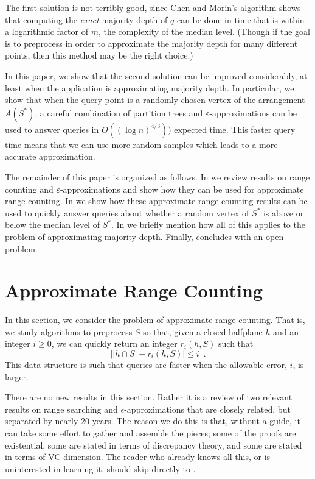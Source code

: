\documentclass{patmorin}
\newcommand{\eps}{\varepsilon}
\begin{document}
The first solution is not terribly good, since Chen and Morin's algorithm
shows that computing the \emph{exact} majority depth of $q$ can be done
in time that is within a logarithmic factor of $m$, the complexity of
the median level.  (Though if the goal is to preprocess in order to
approximate the majority depth for many different points, then this
method may be the right choice.)

In this paper, we show that the second solution can be improved
considerably, at least when the application is approximating majority
depth.  In particular, we show that when the query point is a randomly
chosen vertex of the arrangement $A(S^*)$, a careful combination of
partition trees \cite{c12} and $\eps$-approximations \cite{mww93}
can be used to answer queries in $O((\log n)^{4/3}))$ expected time.
This faster query time means that we can use more random samples which
leads to a more accurate approximation.

The remainder of this paper is organized as follows.  In
 we review results on range counting and
$\eps$-approximations and show how they can be used for approximate range
counting.  In  we show how these approximate range
counting results can be used to quickly answer queries about whether
a random vertex of $S^*$ is above or below the median level of $S^*$.
In  we briefly mention how all of this applies to
the problem of approximating majority depth.  Finally, 
concludes with an open problem.

\section{Approximate Range Counting}

In this section, we consider the problem of approximate range counting.
That is, we study algorithms to preprocess $S$ so that, given a closed
halfplane $h$ and an integer $i\ge 0$, we can quickly return an integer
$r_i(h,S)$ such that
\[
   \left| |h\cap S| - r_i(h,S)\right| \le i \enspace .
\]
This data structure is such that queries are faster when the allowable
error, $i$, is larger.

There are no new results in this section. Rather it is a review of two
relevant results on range searching and $\epsilon$-approximations that are
closely related, but separated by nearly 20 years.  The reason we do this
is that, without a guide, it can take some effort to gather and assemble
the pieces; some of the proofs are existential, some are stated in terms
of discrepancy theory, and some are stated in terms of VC-dimension.
The reader who already knows all this, or is uninterested in learning it,
should skip directly to .
\end{document}
